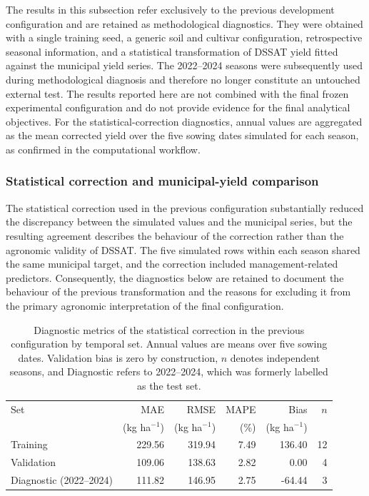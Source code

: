 \documentclass[times,final,authoryear]{elsarticle}
\begin{document}
The results in this subsection refer exclusively to the previous development configuration and are retained as methodological diagnostics. They were obtained with a single training seed, a generic soil and cultivar configuration, retrospective seasonal information, and a statistical transformation of DSSAT yield fitted against the municipal yield series. The 2022--2024 seasons were subsequently used during methodological diagnosis and therefore no longer constitute an untouched external test. The results reported here are not combined with the final frozen experimental configuration and do not provide evidence for the final analytical objectives. For the statistical-correction diagnostics, annual values are aggregated as the mean corrected yield over the five sowing dates simulated for each season, as confirmed in the computational workflow.

\subsubsection{Statistical correction and municipal-yield comparison}
\label{subres_diagnostic_correction}

The statistical correction used in the previous configuration substantially reduced the discrepancy between the simulated values and the municipal series, but the resulting agreement describes the behaviour of the correction rather than the agronomic validity of DSSAT. The five simulated rows within each season shared the same municipal target, and the correction included management-related predictors. Consequently, the diagnostics below are retained to document the behaviour of the previous transformation and the reasons for excluding it from the primary agronomic interpretation of the final configuration.

\begin{table}[!h]
\centering
\caption{Diagnostic metrics of the statistical correction in the previous configuration by temporal set. Annual values are means over five sowing dates. Validation bias is zero by construction, $n$ denotes independent seasons, and Diagnostic refers to 2022--2024, which was formerly labelled as the test set.}
\label{tab_metricas_calibracao}
\begin{tabular}{lrrrrr}
\hline
Set & MAE & RMSE & MAPE & Bias & $n$ \\
    & (kg ha$^{-1}$) & (kg ha$^{-1}$) & (\%) & (kg ha$^{-1}$) & \\
\hline
Training   & 229.56 & 319.94 & 7.49 & 136.40 & 12 \\
Validation & 109.06 & 138.63 & 2.82 & 0.00   & 4  \\
Diagnostic (2022--2024) & 111.82 & 146.95 & 2.75 & -64.44 & 3  \\
\hline
\end{tabular}
\end{table}
\end{document}
